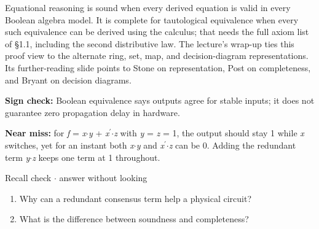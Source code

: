 \documentclass[11pt]{article}
\begin{document}
\begin{keepsection}
\begin{keepsection}
Equational reasoning is sound when every derived equation is valid in every Boolean algebra model. It is complete for tautological equivalence when every such equivalence can be derived using the calculus; that needs the full axiom list of §1.1, including the second distributive law. The lecture’s wrap-up ties this proof view to the alternate ring, set, map, and decision-diagram representations. Its further-reading slide points to Stone on representation, Post on completeness, and Bryant on decision diagrams.

\begin{notebox}\textbf{Sign check:} Boolean equivalence says outputs agree for stable inputs; it does not guarantee zero propagation delay in hardware.\end{notebox}

\begin{notebox}\textbf{Near miss:} for \textit{f} = \textit{x}\ensuremath{\cdot}\textit{y} + \textit{x}\ensuremath{{}^{\prime}}\ensuremath{\cdot}\textit{z} with \textit{y} = \textit{z} = 1, the output should stay 1 while \textit{x} switches, yet for an instant both \textit{x}\ensuremath{\cdot}\textit{y} and \textit{x}\ensuremath{{}^{\prime}}\ensuremath{\cdot}\textit{z} can be 0. Adding the redundant term \textit{y}\ensuremath{\cdot}\textit{z} keeps one term at 1 throughout.\end{notebox}

\begin{recallbox}{Recall check \ensuremath{\cdot} answer without looking}
\begin{enumerate}
\item Why can a redundant consensus term help a physical circuit?
\item What is the difference between soundness and completeness?
\end{enumerate}

\end{recallbox}
\end{keepsection}
\end{keepsection}
\end{document}
